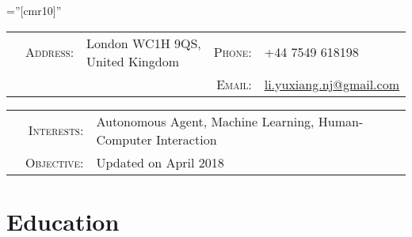 \documentclass[a4paper,10pt]{article} %
\begin{document}
\pagestyle{empty} %

\font\fb=''[cmr10]'' %


\par{} %
\vspace{0.1cm}

\begin{tabular}{@{}p{0.66cm}rp{8.75cm}rl}
& \textsc{Address:} & London WC1H 9QS, United Kingdom & \textsc{Phone:} & +44 7549 618198 \\
& & & \textsc{Email:} & \href{mailto:li.yuxiang.nj@gmail.com}{li.yuxiang.nj@gmail.com}
\end{tabular}

\begin{tabular}{p{0.205cm}rl}
& \textsc{Interests:} & Autonomous Agent, Machine Learning, Human-Computer Interaction \\
& \textsc{Objective:} & Updated on April 2018
\end{tabular}


\section{Education}
\end{document}
